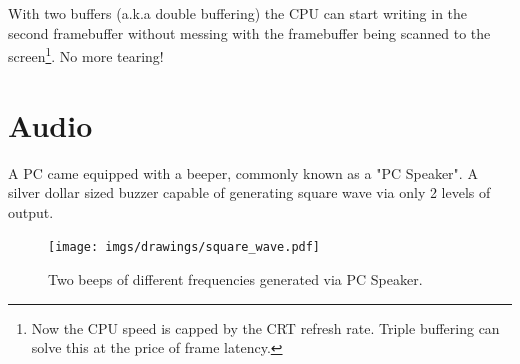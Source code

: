 \documentclass[book.tex]{subfiles}
\begin{document}
\par
With two buffers (a.k.a double buffering) the CPU can start writing in the second framebuffer without messing with the framebuffer being scanned to the screen\footnote{Now the CPU speed is capped by the CRT refresh rate. Triple buffering can solve this at the price of frame latency.}. No more tearing!
















\section{Audio}
A PC came equipped with a beeper, commonly known as a "PC Speaker". A silver dollar sized buzzer capable of generating square wave via only 2 levels of output.\\
\par
 \begin{figure}[H]
\centering
\texttt{[image: imgs/drawings/square\_wave.pdf]}
\caption{Two beeps of different frequencies generated via PC Speaker.}
\end{figure}
\end{document}
